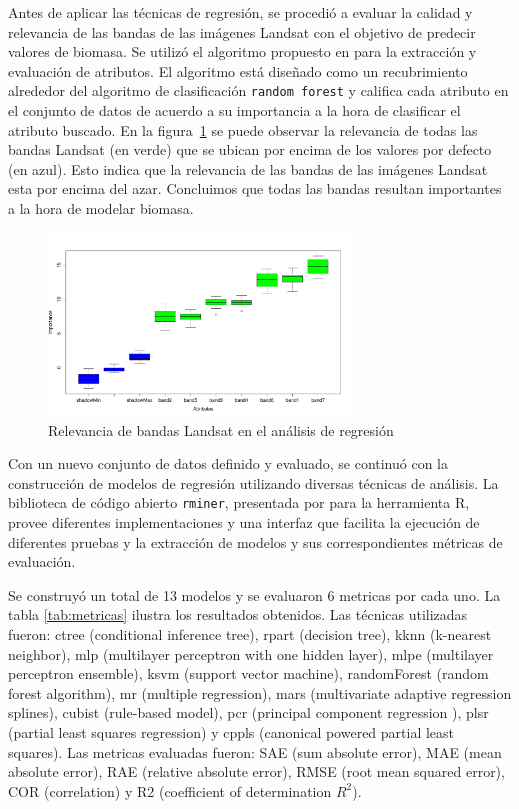Antes de aplicar las técnicas de regresión, se procedió a evaluar la calidad y relevancia de las bandas de las imágenes Landsat con el objetivo de predecir valores de biomasa.  Se utilizó el algoritmo propuesto en \cite{kursa2010feature} para la extracción y evaluación de atributos. El algoritmo está diseñado como un recubrimiento alrededor del algoritmo de clasificación \texttt{random forest} y califica cada atributo en el conjunto de datos de acuerdo a su importancia a la hora de clasificar el atributo buscado. En la figura~\ref{fig:boruta} se puede observar la relevancia de todas las bandas Landsat (en verde) que se ubican por encima de los valores por defecto (en azul).  Esto indica que la relevancia de las bandas de las imágenes Landsat esta por encima del azar. Concluimos que todas las bandas resultan importantes a la hora de modelar biomasa.

\begin{figure}
  \centering
  \includegraphics[width = 8cm]{boruta.pdf}
  \caption{Relevancia de bandas Landsat en el análisis de regresión}
  \label{fig:boruta}
\end{figure}

Con un nuevo conjunto de datos definido y evaluado, se continuó con la construcción de modelos de regresión utilizando diversas técnicas de análisis.  La biblioteca de código abierto \texttt{rminer}, presentada por \cite{cortez2010data} para la herramienta R, provee diferentes implementaciones y una interfaz que facilita la ejecución de diferentes pruebas y la extracción de modelos y sus correspondientes métricas de evaluación.  

Se construyó un total de 13 modelos y se evaluaron 6 metricas por cada uno. La tabla \ref{tab:metricas} ilustra los resultados obtenidos. Las técnicas utilizadas fueron: ctree (conditional inference tree), rpart (decision tree), kknn (k-nearest neighbor), mlp (multilayer perceptron with one hidden layer), mlpe (multilayer perceptron ensemble), ksvm (support vector machine), randomForest (random forest algorithm), mr (multiple regression), mars (multivariate adaptive regression splines), cubist (rule-based model), pcr (principal component regression ), plsr (partial least squares regression) y cppls (canonical powered partial least squares).  Las metricas evaluadas fueron: SAE (sum absolute error), MAE (mean absolute error), RAE (relative absolute error), RMSE (root mean squared error), COR (correlation) y R2 (coefficient of determination $R^2$).

